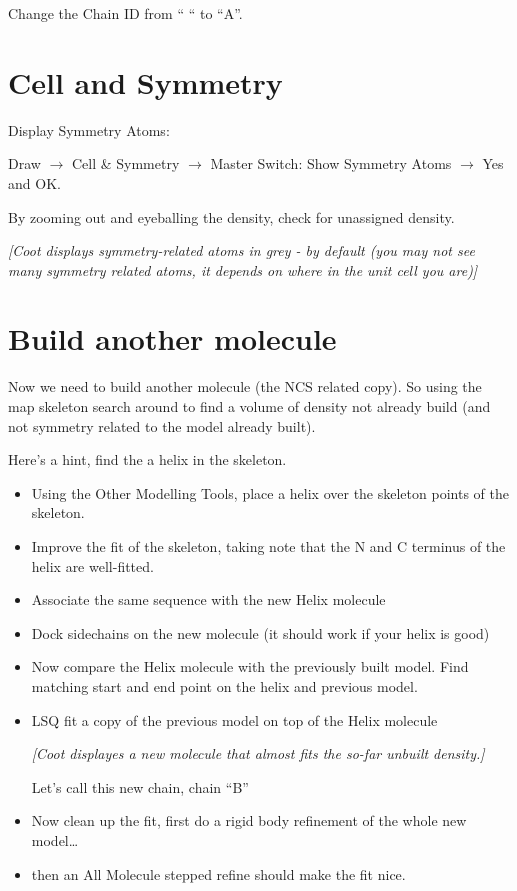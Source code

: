 \documentclass{article}
\begin{document}
Change the Chain ID from `` `` to ``A''.

\section{Cell and Symmetry}

Display Symmetry Atoms:

\textsf{Draw $\rightarrow$ Cell \& Symmetry $\rightarrow$ Master
  Switch: Show Symmetry Atoms $\rightarrow$ Yes} and \textsf{OK}.

By zooming out and eyeballing the density, check for unassigned density.

\textsl{ [Coot displays symmetry-related atoms in grey - by default
  (you may not see many symmetry related atoms, it depends on where in
  the unit cell you are)]}


\section{Build another molecule}


Now we need to build another molecule (the NCS related copy).  So
using the map skeleton search around to find a volume of density not
already build (and not symmetry related to the model already built).

Here's a hint, find the a helix in the skeleton. 

\begin{itemize}
\item Using the Other Modelling Tools, place a helix over the skeleton
  points of the skeleton.
\item Improve the fit of the skeleton, taking note that the N and C
  terminus of the helix are well-fitted.
\item Associate the same sequence with the new Helix molecule
\item Dock sidechains on the new molecule (it should work if your
  helix is good)
\item Now compare the Helix molecule with the previously built model.
  Find matching start and end point on the helix and previous model.
\item LSQ fit a copy of the previous model on top of the Helix molecule

  \textsl{ [Coot displayes a new molecule that almost fits the so-far
    unbuilt density.]}

  Let's call this new chain, chain ``B''

\item Now clean up the fit, first do a rigid body refinement of the
  whole new model\ldots{}

\item then an All Molecule stepped refine should make the fit nice.

\end{itemize}
\end{document}
